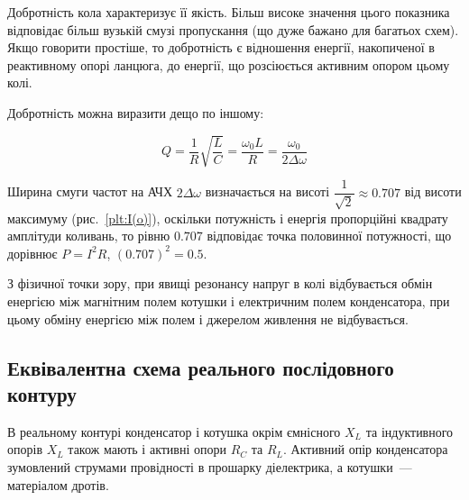 \documentclass[]{LabWork}
\begin{document}
Добротність кола характеризує її якість. Більш високе значення цього показника відповідає більш вузькій смузі пропускання (що дуже бажано для багатьох схем). Якщо говорити простіше, то добротність є відношення енергії, накопиченої в реактивному опорі ланцюга, до енергії, що розсіюється активним опором цьому колі.

Добротність можна виразити дещо по іншому:

\begin{equation}
	Q = \frac{1}{R} \sqrt{\frac{L}{C}} = \frac{\omega_0 L}{R} = \frac{\omega_0}{2\Delta\omega}
\end{equation}

Ширина смуги частот на АЧХ $2\Delta\omega$ визначається на висоті $\dfrac1{\sqrt2}\approx 0.707$ від висоти максимуму (рис.~\ref{plt:I(o)}),  оскільки потужність і енергія пропорційні квадрату амплітуди коливань, то рівню $0.707$ відповідає точка половинної потужності, що дорівнює $P = I^2R$, $(0.707)^2 = 0.5$.

\noindent\bigskip%
\begin{More}

	З фізичної точки зору, при явищі резонансу напруг в колі відбувається обмін енергією між магнітним полем котушки і електричним полем конденсатора, при цьому обміну енергією між полем і джерелом живлення не відбувається.
\end{More}

\subsection{Еквівалентна схема реального послідовного контуру}

В реальному контурі конденсатор і котушка окрім ємнісного $X_L$ та індуктивного опорів $X_L$ також мають і активні опори $R_C$ та $R_L$. Активний опір конденсатора зумовлений струмами провідності в прошарку діелектрика, а котушки~--- матеріалом дротів.
\end{document}
